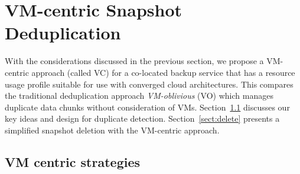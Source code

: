 \section{VM-centric Snapshot Deduplication}
\label{sect:deduplication}


With the considerations discussed in the previous section, we propose a
VM-centric approach (called VC)
for a co-located backup service that has a resource usage profile
suitable for use with converged cloud architectures.
This compares the traditional deduplication approach {\em VM-oblivious} (VO)
which manages duplicate data chunks without consideration of VMs.
Section~\ref{sect:vc-strategies} discusses  our key ideas and design for duplicate detection.
Section~\ref{sect:delete} presents  a simplified snapshot deletion with  the VM-centric approach.

\subsection{VM centric  strategies}
\label{sect:vc-strategies}

